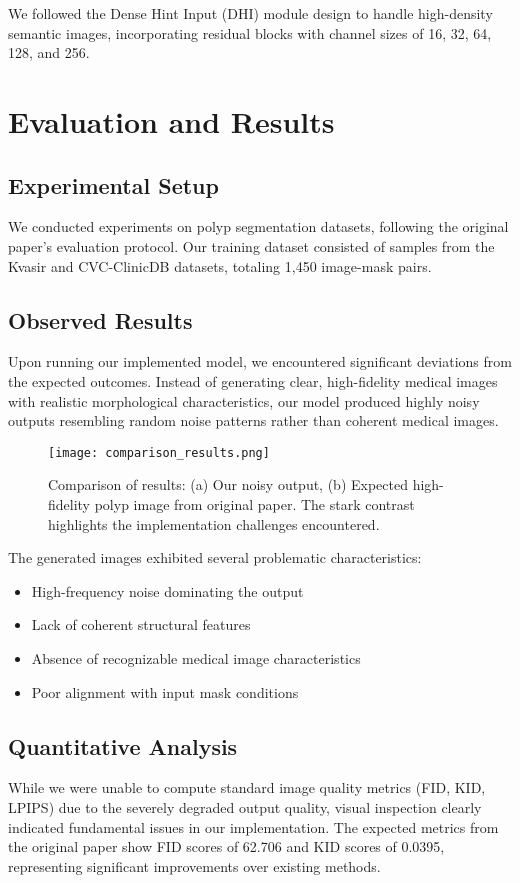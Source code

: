 \documentclass[conference]{IEEEtran}
\begin{document}
We followed the Dense Hint Input (DHI) module design to handle high-density semantic images, incorporating residual blocks with channel sizes of 16, 32, 64, 128, and 256.

\section{Evaluation and Results}

\subsection{Experimental Setup}
We conducted experiments on polyp segmentation datasets, following the original paper's evaluation protocol. Our training dataset consisted of samples from the Kvasir and CVC-ClinicDB datasets, totaling 1,450 image-mask pairs.

\subsection{Observed Results}
Upon running our implemented model, we encountered significant deviations from the expected outcomes. Instead of generating clear, high-fidelity medical images with realistic morphological characteristics, our model produced highly noisy outputs resembling random noise patterns rather than coherent medical images.

\begin{figure}[htb]
\centering
\texttt{[image: comparison\_results.png]}
\caption{Comparison of results: (a) Our noisy output, (b) Expected high-fidelity polyp image from original paper. The stark contrast highlights the implementation challenges encountered.}
\label{fig:results}
\end{figure}

The generated images exhibited several problematic characteristics:
\begin{itemize}
    \item High-frequency noise dominating the output
    \item Lack of coherent structural features
    \item Absence of recognizable medical image characteristics
    \item Poor alignment with input mask conditions
\end{itemize}

\subsection{Quantitative Analysis}
While we were unable to compute standard image quality metrics (FID, KID, LPIPS) due to the severely degraded output quality, visual inspection clearly indicated fundamental issues in our implementation. The expected metrics from the original paper show FID scores of 62.706 and KID scores of 0.0395, representing significant improvements over existing methods.
\end{document}
